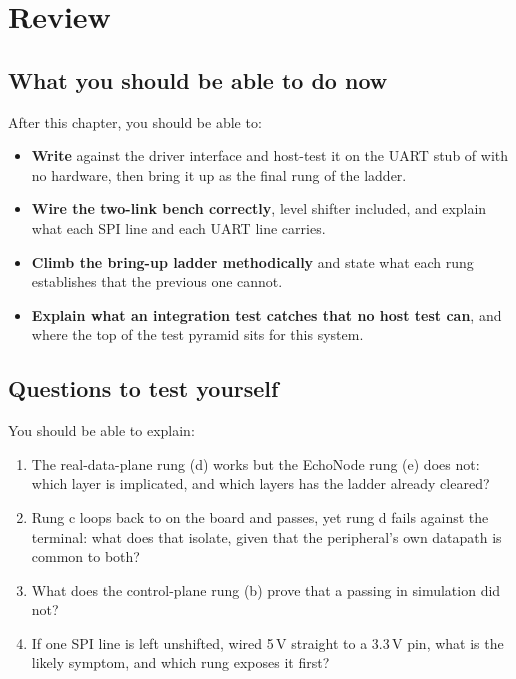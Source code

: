 
\section{Review}
\label{c10:sec:review}

\subsection*{What you should be able to do now}
After this chapter, you should be able to:
\begin{itemize}
  \item \textbf{Write } against the driver interface and host-test it on the
    UART stub of  with no hardware, then bring it up as the final rung of the ladder.
  \item \textbf{Wire the two-link bench correctly}, level shifter included, and explain what each
    SPI line and each UART line carries.
  \item \textbf{Climb the bring-up ladder methodically} and state what each rung establishes that
    the previous one cannot.
  \item \textbf{Explain what an integration test catches that no host test can}, and where the top
    of the test pyramid sits for this system.
\end{itemize}

\subsection*{Questions to test yourself}
You should be able to explain:
\begin{enumerate}
  \item The real-data-plane rung (d) works but the EchoNode rung (e) does not: which layer is
    implicated, and which layers has the ladder already cleared?
  \item Rung c loops  back to  on the board and passes, yet rung d fails against
    the terminal: what does that isolate, given that the peripheral's own datapath is common to
    both?
  \item What does the control-plane rung (b) prove that a passing  in simulation
    did not?
  \item If one SPI line is left unshifted, wired 5\,V straight to a 3.3\,V pin, what is the likely
    symptom, and which rung exposes it first?
\end{enumerate}

